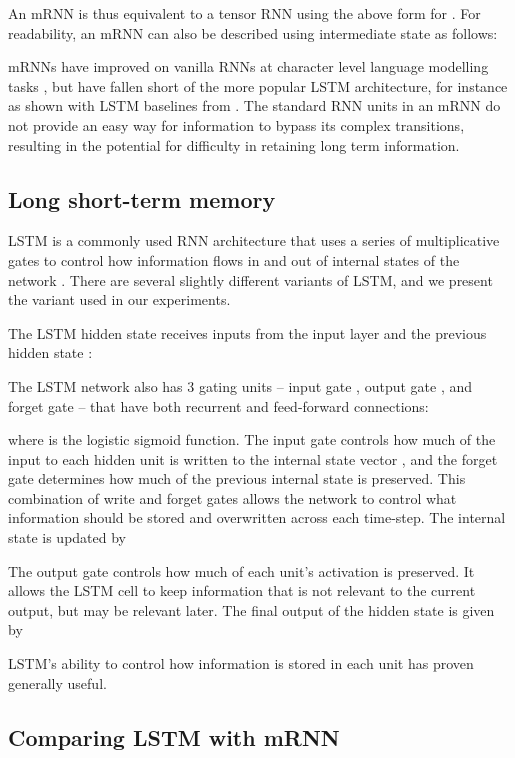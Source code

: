 \documentclass{article}
\begin{document}
An mRNN is thus equivalent to a tensor RNN using the above form for . For readability, an mRNN can also be described using intermediate state  as follows:




mRNNs have improved on vanilla RNNs at character level language modelling tasks \citep{Sutskever-2011,mikolov2012c}, but have fallen short of the more popular LSTM architecture, for instance as shown with LSTM baselines from \citep{cooijmans2017}. The standard RNN units in an mRNN do not provide an easy way for information to bypass its complex transitions, resulting in the potential for difficulty in retaining long term information.


\subsection{Long short-term memory}
LSTM is a commonly used RNN architecture that uses a series of multiplicative gates to control how information flows in and out of internal states of the network \citep{Hochreiter-1997}. There are several slightly different variants of LSTM, and we present the variant used in our experiments. 

The LSTM hidden state receives inputs from the input layer  and the previous hidden state :


 The LSTM network also has 3 gating units -- input gate , output gate , and forget gate  -- that have both recurrent and feed-forward connections:

where  is the logistic sigmoid function. The input gate controls how much of the input to each hidden unit is written to the internal state vector , and the forget gate determines how much of the previous internal state  is preserved. This combination of write and forget gates allows the network to control what information should be stored and overwritten across each time-step. The internal state is updated by


The output gate controls how much of each unit's activation is preserved. It allows the LSTM cell to keep information that is not relevant to the current output, but may be relevant later. The final output of the hidden state is given by

LSTM's ability to control how information is stored in each unit has proven generally useful.


\subsection{Comparing LSTM with mRNN}
 
\end{document}

